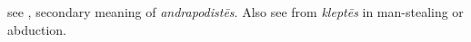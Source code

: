 \item[Kidnapper,]

see , secondary meaning of \emph{andrapodistēs}. Also see  from \emph{kleptēs} in man-stealing or abduction.
